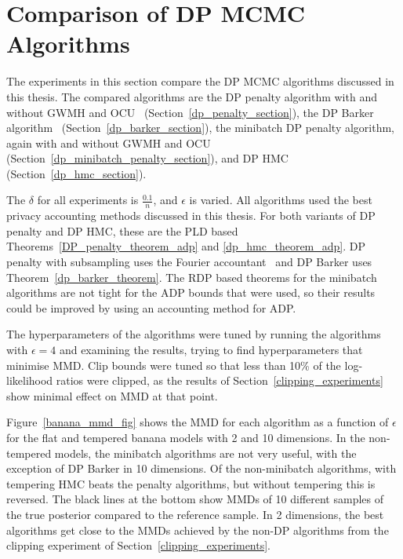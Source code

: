 \documentclass[english,twoside,openright]{HYgraduMLDS}
\begin{document}
\section{Comparison of DP MCMC Algorithms}\label{dp_mcmc_comparison}

The experiments in this section compare the DP MCMC algorithms discussed in this
thesis. The compared algorithms are the DP penalty algorithm with and without
GWMH and OCU~\cite{YildirimE19}
(Section~\ref{dp_penalty_section}), the DP Barker algorithm~\cite{HeikkilaJDH19}
(Section~\ref{dp_barker_section}), the minibatch DP penalty algorithm, again
with and without GWMH and OCU (Section~\ref{dp_minibatch_penalty_section}), and
DP HMC (Section~\ref{dp_hmc_section}).

The \(\delta\) for all experiments is \(\frac{0.1}{n}\), and \(\epsilon\) is
varied.
All algorithms used the best privacy accounting methods discussed in this thesis.
For both variants of DP penalty and DP HMC, these are the PLD based
Theorems~\ref{DP_penalty_theorem_adp} and \ref{dp_hmc_theorem_adp}.
DP penalty with subsampling uses the Fourier accountant~\cite{KJH20}
and DP Barker uses Theorem~\ref{dp_barker_theorem}. The RDP based theorems
for the minibatch algorithms are not tight for the ADP bounds that were used,
so their results could be improved by using an accounting method for ADP.

The hyperparameters of the algorithms
were tuned by running the algorithms with \(\epsilon = 4\) and examining the
results, trying to find hyperparameters that minimise MMD. Clip bounds were
tuned so that less than 10\% of the log-likelihood ratios were clipped,
as the results of Section~\ref{clipping_experiments} show minimal effect on
MMD at that point.

Figure~\ref{banana_mmd_fig} shows the MMD for each algorithm as a function of
\(\epsilon\) for the flat and tempered banana models with 2 and 10 dimensions.
In the non-tempered models, the minibatch algorithms are not very useful,
with the exception of DP Barker in 10 dimensions. Of the non-minibatch algorithms,
with tempering HMC beats the penalty algorithms, but without tempering this is
reversed. The black lines at the bottom show MMDs of 10 different samples of the
true posterior compared to the reference sample. In 2 dimensions, the best
algorithms get close to the MMDs achieved by the non-DP algorithms from
the clipping experiment of Section~\ref{clipping_experiments}.
\end{document}
